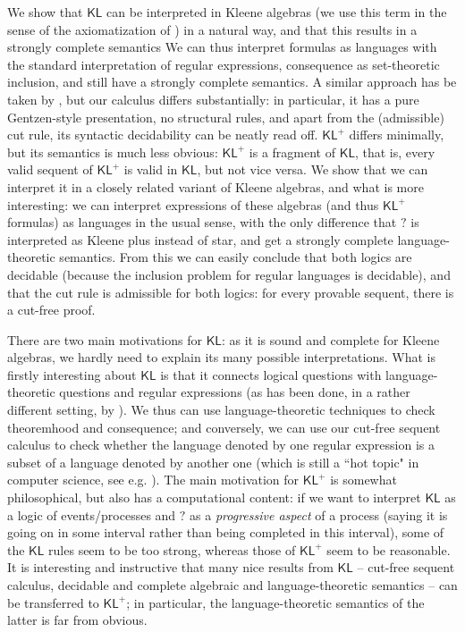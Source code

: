 \documentclass{eptcs}
\newcommand{\KL}{\mathsf{KL}}
\begin{document}
We show that $\KL$ can be interpreted in Kleene algebras (we use this
term in the sense of the axiomatization of \cite{kozen:kleene}) in a
natural way, and that this results in a strongly complete semantics
We can thus interpret formulas as languages with the standard interpretation
of regular expressions, consequence as set-theoretic inclusion,
and still have a strongly complete semantics. 
A similar approach has be taken by \cite{kozen:substructural}, but our
calculus differs substantially: in particular, it has a pure
Gentzen-style presentation, no structural rules, and apart from the (admissible) 
cut rule, its syntactic decidability can be neatly read off.
$\KL^+$ differs minimally, but its semantics is much
less obvious: $\KL^+$ is a fragment of $\KL$, that is, every
valid sequent of $\KL^+$ is valid in $\KL$, but not vice versa. 
We show that
we can interpret it in a closely related variant of Kleene algebras,
and what is more interesting: we can interpret  expressions of these
algebras (and thus $\KL^+$ formulas) 
as languages in the usual sense, with the only difference
that $?$ is interpreted as Kleene plus instead of star, and get a
strongly complete language-theoretic semantics. From this we can easily
conclude that both logics are decidable (because the inclusion problem
for regular languages is decidable), and that the cut rule
is admissible for both logics: for every provable sequent, there is a
cut-free proof.

There are two main motivations for $\KL$: as it is sound and complete
for Kleene algebras, we hardly need to explain its many possible
interpretations. What is firstly interesting about $\KL$ is that it connects
logical questions with language-theoretic questions and regular expressions
(as has been done, in a rather different setting, by
\cite{babu:chop}). We thus can use language-theoretic
techniques to check theoremhood and consequence; and conversely, we can
use our cut-free sequent calculus to check whether the language denoted
by one regular expression is a subset of a language denoted by another 
one (which is still a ``hot topic" in computer science, see e.g.
\cite{hovland:inclusion}).
The main motivation for $\KL^+$ is somewhat philosophical, but also
has a computational content: if we want to
interpret $\KL$ as a logic of events/processes and $?$ as a \textit{progressive
aspect} of a process (saying it is going on in some interval
rather than being completed in this interval), 
some of the $\KL$ rules seem to be too strong,
whereas those of $\KL^+$ seem to be reasonable. It is interesting and
instructive that many nice results from $\KL$ -- cut-free sequent
calculus, decidable and complete algebraic and language-theoretic
semantics -- can be transferred to $\KL^+$; in particular, the
language-theoretic semantics of the latter is far from obvious.
\end{document}
